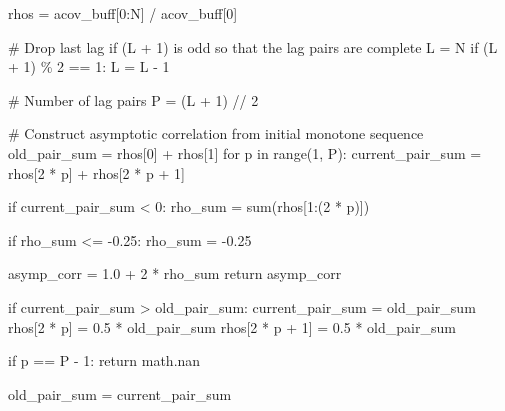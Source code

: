 \documentclass[
  letterpaper,
  DIV=11,
  numbers=noendperiod]{scrartcl}
\newenvironment{Shaded}{\begin{snugshade}}{\end{snugshade}}
\newcommand{\BuiltInTok}[1]{\textcolor[rgb]{0.00,0.23,0.31}{#1}}
\newcommand{\CommentTok}[1]{\textcolor[rgb]{0.37,0.37,0.37}{#1}}
\newcommand{\ControlFlowTok}[1]{\textcolor[rgb]{0.00,0.23,0.31}{#1}}
\newcommand{\DecValTok}[1]{\textcolor[rgb]{0.68,0.00,0.00}{#1}}
\newcommand{\FloatTok}[1]{\textcolor[rgb]{0.68,0.00,0.00}{#1}}
\newcommand{\KeywordTok}[1]{\textcolor[rgb]{0.00,0.23,0.31}{#1}}
\newcommand{\NormalTok}[1]{\textcolor[rgb]{0.00,0.23,0.31}{#1}}
\newcommand{\OperatorTok}[1]{\textcolor[rgb]{0.37,0.37,0.37}{#1}}
\begin{document}
\begin{Shaded}
\begin{Highlighting}[]
\NormalTok{  rhos }\OperatorTok{=}\NormalTok{ acov\_buff[}\DecValTok{0}\NormalTok{:N] }\OperatorTok{/}\NormalTok{ acov\_buff[}\DecValTok{0}\NormalTok{]}

  \CommentTok{\# Drop last lag if (L + 1) is odd so that the lag pairs are complete}
\NormalTok{  L }\OperatorTok{=}\NormalTok{ N}
  \ControlFlowTok{if}\NormalTok{ (L }\OperatorTok{+} \DecValTok{1}\NormalTok{) }\OperatorTok{\%} \DecValTok{2} \OperatorTok{==} \DecValTok{1}\NormalTok{:}
\NormalTok{    L }\OperatorTok{=}\NormalTok{ L }\OperatorTok{{-}} \DecValTok{1}

  \CommentTok{\# Number of lag pairs}
\NormalTok{  P }\OperatorTok{=}\NormalTok{ (L }\OperatorTok{+} \DecValTok{1}\NormalTok{) }\OperatorTok{//} \DecValTok{2}

  \CommentTok{\# Construct asymptotic correlation from initial monotone sequence}
\NormalTok{  old\_pair\_sum }\OperatorTok{=}\NormalTok{ rhos[}\DecValTok{0}\NormalTok{] }\OperatorTok{+}\NormalTok{ rhos[}\DecValTok{1}\NormalTok{]}
  \ControlFlowTok{for}\NormalTok{ p }\KeywordTok{in} \BuiltInTok{range}\NormalTok{(}\DecValTok{1}\NormalTok{, P):}
\NormalTok{    current\_pair\_sum }\OperatorTok{=}\NormalTok{ rhos[}\DecValTok{2} \OperatorTok{*}\NormalTok{ p] }\OperatorTok{+}\NormalTok{ rhos[}\DecValTok{2} \OperatorTok{*}\NormalTok{ p }\OperatorTok{+} \DecValTok{1}\NormalTok{]}

    \ControlFlowTok{if}\NormalTok{ current\_pair\_sum }\OperatorTok{\textless{}} \DecValTok{0}\NormalTok{:}
\NormalTok{      rho\_sum }\OperatorTok{=} \BuiltInTok{sum}\NormalTok{(rhos[}\DecValTok{1}\NormalTok{:(}\DecValTok{2} \OperatorTok{*}\NormalTok{ p)])}

      \ControlFlowTok{if}\NormalTok{ rho\_sum }\OperatorTok{\textless{}=} \OperatorTok{{-}}\FloatTok{0.25}\NormalTok{:}
\NormalTok{        rho\_sum }\OperatorTok{=} \OperatorTok{{-}}\FloatTok{0.25}

\NormalTok{      asymp\_corr }\OperatorTok{=} \FloatTok{1.0} \OperatorTok{+} \DecValTok{2} \OperatorTok{*}\NormalTok{ rho\_sum}
      \ControlFlowTok{return}\NormalTok{ asymp\_corr}

    \ControlFlowTok{if}\NormalTok{ current\_pair\_sum }\OperatorTok{\textgreater{}}\NormalTok{ old\_pair\_sum:}
\NormalTok{      current\_pair\_sum }\OperatorTok{=}\NormalTok{ old\_pair\_sum}
\NormalTok{      rhos[}\DecValTok{2} \OperatorTok{*}\NormalTok{ p]     }\OperatorTok{=} \FloatTok{0.5} \OperatorTok{*}\NormalTok{ old\_pair\_sum}
\NormalTok{      rhos[}\DecValTok{2} \OperatorTok{*}\NormalTok{ p }\OperatorTok{+} \DecValTok{1}\NormalTok{] }\OperatorTok{=} \FloatTok{0.5} \OperatorTok{*}\NormalTok{ old\_pair\_sum}

    \ControlFlowTok{if}\NormalTok{ p }\OperatorTok{==}\NormalTok{ P }\OperatorTok{{-}} \DecValTok{1}\NormalTok{:}
      \ControlFlowTok{return}\NormalTok{ math.nan}

\NormalTok{    old\_pair\_sum }\OperatorTok{=}\NormalTok{ current\_pair\_sum}

\end{Highlighting}
\end{Shaded}
\end{document}
